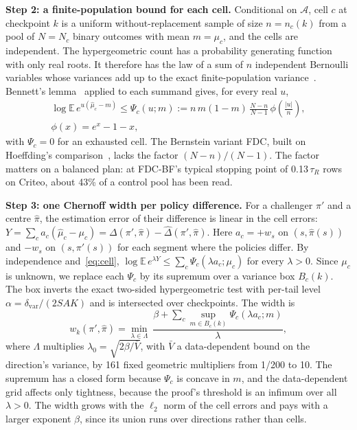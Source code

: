 \documentclass[sigconf,anonymous,review]{acmart}
\newcommand{\cA}{\mathcal{A}}
\newcommand{\dvar}{\delta_{\text{var}}}
\begin{document}
\textbf{Step 2: a finite-population bound for each cell.} Conditional on $\cA$, cell $c$ at checkpoint $k$ is a uniform without-replacement sample of size $n = n_c(k)$ from a pool of $N = N_c$ binary outcomes with mean $m = \mu_c$, and the cells are independent. The hypergeometric count has a probability generating function with only real roots. It therefore has the law of a sum of $n$ independent Bernoulli variables whose variances add up to the exact finite-population variance~\citep{vatutin1982limit,tang2023poisson}. Bennett's lemma~\citep{bennett1962probability} applied to each summand gives, for every real $u$,
\begin{equation}\label{eq:cell}
\begin{gathered}
\log \mathbb{E}\, e^{u(\hat\mu_c - m)} \le \Psi_c(u; m) := n\, m(1-m)\,\frac{N-n}{N-1}\,\phi\!\left(\frac{|u|}{n}\right),\\
\phi(x) = e^x - 1 - x,
\end{gathered}
\end{equation}
with $\Psi_c = 0$ for an exhausted cell. The Bernstein variant FDC, built on Hoeffding's comparison~\citep{hoeffding1963probability}, lacks the factor $(N-n)/(N-1)$. The factor matters on a balanced plan: at FDC-BF's typical stopping point of 0.13\,$\tau_R$ rows on Criteo, about 43\% of a control pool has been read.

\textbf{Step 3: one Chernoff width per policy difference.} For a challenger $\pi'$ and a centre $\hat\pi$, the estimation error of their difference is linear in the cell errors: $Y = \sum_c a_c(\hat\mu_c - \mu_c) = \Delta(\pi',\hat\pi) - \hat\Delta(\pi',\hat\pi)$. Here $a_c = +w_s$ on $(s, \hat\pi(s))$ and $-w_s$ on $(s, \pi'(s))$ for each segment where the policies differ. By independence and~\eqref{eq:cell}, $\log \mathbb{E}\, e^{\lambda Y} \le \sum_c \Psi_c(\lambda a_c; \mu_c)$ for every $\lambda > 0$. Since $\mu_c$ is unknown, we replace each $\Psi_c$ by its supremum over a variance box $B_c(k)$. The box inverts the exact two-sided hypergeometric test with per-tail level $\alpha = \dvar/(2SAK)$ and is intersected over checkpoints. The width is
\begin{equation}\label{eq:width}
w_k(\pi',\hat\pi) = \min_{\lambda \in \Lambda}\ \frac{\beta + \sum_c \sup_{m \in B_c(k)} \Psi_c(\lambda a_c; m)}{\lambda},
\end{equation}
where $\Lambda$ multiplies $\lambda_0 = \sqrt{2\beta/\bar V}$, with $\bar V$ a data-dependent bound on the direction's variance, by 161 fixed geometric multipliers from 1/200 to 10. The supremum has a closed form because $\Psi_c$ is concave in $m$, and the data-dependent grid affects only tightness, because the proof's threshold is an infimum over all $\lambda > 0$. The width grows with the $\ell_2$ norm of the cell errors and pays with a larger exponent $\beta$, since its union runs over directions rather than cells.
\end{document}
